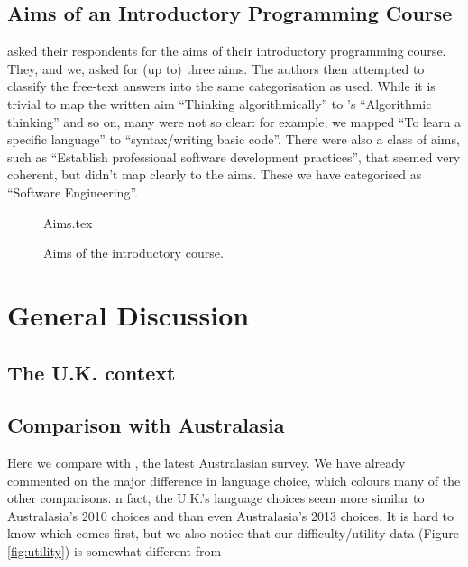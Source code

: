 \documentclass{sig-alternate}
\begin{document}
\subsection{Aims of an Introductory Programming Course}
 \cite{mason+cooper:2014} asked their respondents for the aims of their introductory programming course. They, and we, asked for (up to) three aims. The authors then attempted to classify the free-text answers into the same categorisation as  \cite{mason+cooper:2014} used. While it is trivial to map the written aim ``Thinking algorithmically'' to \cite{mason+cooper:2014}'s ``Algorithmic thinking'' and so on, many were not so clear: for example, we mapped ``To learn a specific language'' to ``syntax/writing basic code''. There were also a class of aims, such as ``Establish professional software development practices'', that seemed very coherent, but didn't map clearly to the \cite{mason+cooper:2014} aims. These we have categorised as ``Software Engineering''.

\begin{figure}
\begin{center}
{Aims.tex}
\end{center}\vskip-18pt
\caption{Aims of the introductory course. \label{fig:aims}}
\end{figure}

\section{General Discussion}\label{discussion}

\subsection{The U.K. context}

\subsection{Comparison with Australasia}
Here we compare with \cite{mason+cooper:2014}, the latest Australasian survey. We have already commented on the major difference in language choice,  which colours many of the other comparisons. n fact, the U.K.'s language choices seem more similar to Australasia's 2010 choices \cite{mason-et-al:2012} and \cite[Table 4]{mason+cooper:2014} than even Australasia's 2013 choices. It is hard to know which comes first, but we also notice that our difficulty/utility data (Figure \ref{fig:utility}) is somewhat different from \cite[Figures 7,8]{mason+cooper:2014}
\end{document}

